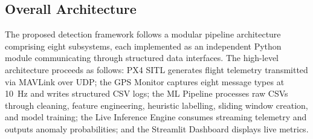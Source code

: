\documentclass[electronics,article,accept,moreauthors]{Definitions/mdpi}
\begin{document}
\subsection{Overall Architecture}
\label{sec:architecture}

The proposed detection framework follows a modular pipeline architecture comprising eight subsystems, each implemented as an independent Python module communicating through structured data interfaces. The high-level architecture proceeds as follows: PX4 SITL generates flight telemetry transmitted via MAVLink over UDP; the GPS Monitor captures eight message types at 10~Hz and writes structured CSV logs; the ML Pipeline processes raw CSVs through cleaning, feature engineering, heuristic labelling, sliding window creation, and model training; the Live Inference Engine consumes streaming telemetry and outputs anomaly probabilities; and the Streamlit Dashboard displays live metrics.
\end{document}
